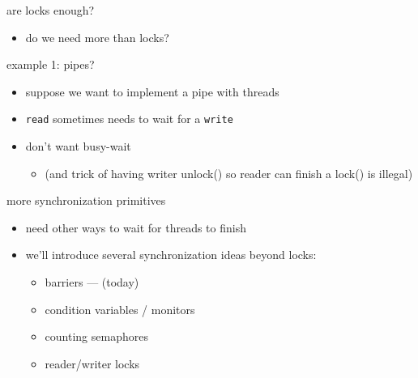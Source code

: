 \begin{frame}{are locks enough?}
\begin{itemize}
    \item do we need more than locks?
\end{itemize}
\end{frame}

\begin{frame}{example 1: pipes?}
\begin{itemize}
\item suppose we want to implement a pipe with threads
\item \texttt{read} sometimes needs to wait for a \texttt{write}
\item don't want busy-wait
\begin{itemize}
\item (and trick of having writer unlock() so reader can finish a lock() is illegal)
\end{itemize}
\end{itemize}
\end{frame}

\begin{frame}{more synchronization primitives}
    \begin{itemize}
    \item need other ways to wait for threads to finish
    \item we'll introduce several synchronization ideas beyond locks:
        \begin{itemize}
        \item barriers --- (today)
        \item condition variables / monitors
        \item counting semaphores
        \item reader/writer locks
        \end{itemize}
    \end{itemize}
\end{frame}
